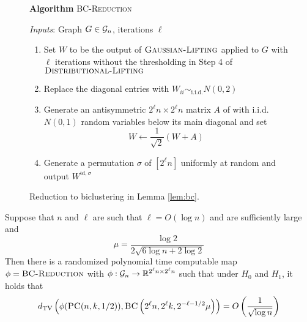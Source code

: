 \begin{figure}[t!]
\begin{algbox}
\textbf{Algorithm} \textsc{BC-Reduction}

\vspace{2mm}

\textit{Inputs}: Graph $G \in \mathcal{G}_n$, iterations $\ell$
\begin{enumerate}
\item Set $W$ to be the output of $\textsc{Gaussian-Lifting}$ applied to $G$ with $\ell$ iterations without the thresholding in Step 4 of $\textsc{Distributional-Lifting}$
\item Replace the diagonal entries with $W_{ii} \sim_{\text{i.i.d.}} N(0, 2)$
\item Generate an antisymmetric $2^\ell n \times 2^\ell n$ matrix $A$ of with i.i.d. $N(0, 1)$ random variables below its main diagonal and set
$$W \gets \frac{1}{\sqrt{2}} \left( W + A \right)$$
\item Generate a permutation $\sigma$ of $[2^\ell n]$ uniformly at random and output $W^{\text{id}, \sigma}$
\end{enumerate}
\vspace{1mm}
\end{algbox}
\caption{Reduction to biclustering in Lemma \ref{lem:bc}.}
\label{fig:bc}
\end{figure}

\begin{lemma} \label{lem:bc}
Suppose that $n$ and $\ell$ are such that $\ell = O(\log n)$ and are sufficiently large and
$$\mu = \frac{\log 2}{2 \sqrt{6 \log n + 2\log 2}}$$
Then there is a randomized polynomial time computable map $\phi = \textsc{BC-Reduction}$ with $\phi : \mathcal{G}_n \to \mathbb{R}^{2^\ell n \times 2^\ell n}$ such that under $H_0$ and $H_1$, it holds that
$$d_{\text{TV}}\left( \phi(\textsc{PC}(n, k, 1/2)), \textsc{BC}\left(2^\ell n, 2^\ell k, 2^{-\ell - 1/2} \mu \right) \right) = O\left(\frac{1}{\sqrt{\log n}} \right)$$
\end{lemma}

